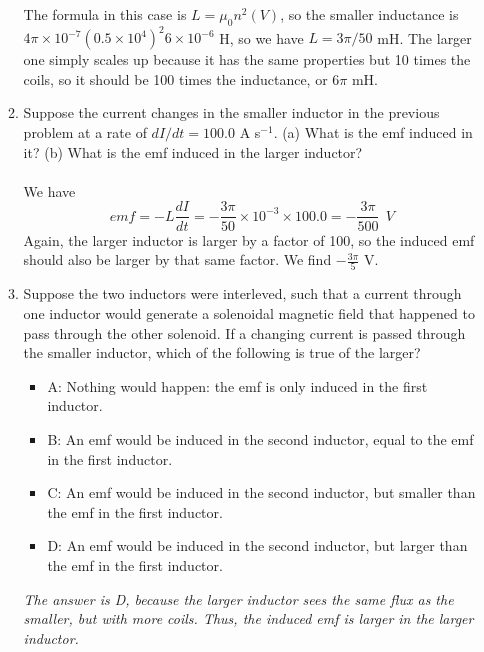 \documentclass[10pt]{article}
\begin{document}
\begin{enumerate}
\begin{enumerate}
The formula in this case is $L = \mu_0 n^2 (V)$, so the smaller inductance is $4\pi \times 10^{-7} (0.5 \times 10^{4})^2 6 \times 10^{-6}$ H, so we have $L = 3\pi/50$ mH.  The larger one simply scales up because it has the same properties but 10 times the coils, so it should be 100 times the inductance, or $6\pi$ mH. \\
\item Suppose the current changes in the smaller inductor in the previous problem at a rate of $dI/dt = 100.0$ A s$^{-1}$.  (a) What is the emf induced in it?  (b) What is the emf induced in the larger inductor? \\ \\
We have
\begin{equation}
emf = -L \frac{dI}{dt} = - \frac{3\pi}{50} \times 10^{-3} \times 100.0 = - \frac{3\pi}{500}~~V
\end{equation}
Again, the larger inductor is larger by a factor of 100, so the induced emf should also be larger by that same factor.  We find $-\frac{3\pi}{5}$ V. \\
\item Suppose the two inductors were interleved, such that a current through one inductor would generate a solenoidal magnetic field that happened to pass through the other solenoid.  If a changing current is passed through the smaller inductor, which of the following is true of the larger?
\begin{itemize}
\item A: Nothing would happen: the emf is only induced in the first inductor.
\item B: An emf would be induced in the second inductor, equal to the emf in the first inductor.
\item C: An emf would be induced in the second inductor, but smaller than the emf in the first inductor.
\item D: An emf would be induced in the second inductor, but larger than the emf in the first inductor.
\end{itemize}
\textit{The answer is D, because the larger inductor sees the same flux as the smaller, but with more coils.  Thus, the induced emf is larger in the larger inductor.}
\end{enumerate}
\end{enumerate}
\end{document}
